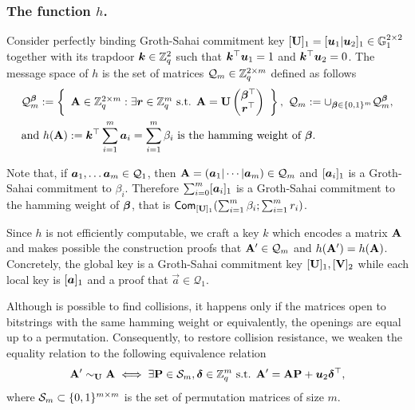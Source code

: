 
\subsubsection{The function $h$.} Consider perfectly binding Groth-Sahai commitment key $[\mathbf{{U}}]_1 = [{\boldsymbol{u}}_1|{\boldsymbol{u}}_2]_1\in\mathbb{G}_1^{2\times 2}$ together with its trapdoor ${\boldsymbol{k}}\in\mathbb{Z}_q^2$ such that ${\boldsymbol{k}}^\top{\boldsymbol{u}}_1 = 1$ and ${\boldsymbol{k}}^\top{\boldsymbol{u}}_2 = 0$. The message space of $h$ is the set of matrices $\mathcal{Q}_m\in\mathbb{Z}_q^{2\times m}$ defined as follows
\begin{align*}
&\mathcal{Q}_m^{\boldsymbol{\beta}} := \left\{
\begin{array}{c}
\mathbf{{A}} \in \mathbb{Z}_q^{2\times m}:
\exists {\boldsymbol{r}}\in\mathbb{Z}_q^m\text{ s.t. }
{\mathbf{{A}} = \mathbf{{U}}\left(\begin{matrix}{\boldsymbol{\beta}}^\top\\{\boldsymbol{r}}^\top\end{matrix}\right)
}
\end{array}\right\},
\ \mathcal{Q}_m := \cup_{{\boldsymbol{\beta}}\in\{0,1\}^m} \mathcal{Q}_m^{\boldsymbol{\beta}},\\
&\text{and } h(\mathbf{{A}}):= {\boldsymbol{k}}^\top\sum_{i=1}^m{\boldsymbol{a}}_i = \sum_{i=1}^m \beta_i \text{ is the hamming weight of }{\boldsymbol{\beta}}.
\end{align*}

Note that, if ${\boldsymbol{a}}_1,\ldots {\boldsymbol{a}}_m\in\mathcal{Q}_{1}$, then $\matr{A} = (\vec{a}_1\cat\cdots\cat\vecb{a}_m)\in\mathcal{Q}_{m}$ and $[{\boldsymbol{a}}_i]_1$ is a Groth-Sahai commitment to $\beta_i$.
Therefore $\sum_{i=0}^m[{\boldsymbol{a}}_i]_1$ is a Groth-Sahai commitment to the hamming weight of ${\boldsymbol{\beta}}$, that is $\mathsf{Com}_{[\mathbf{{U}}]_1}(\sum_{i=1}^m \beta_i;\sum_{i=1}^m r_i)$.

Since $h$ is not efficiently computable, we craft a key $k$ which encodes a matrix $\mathbf{{A}}$ and makes possible the construction proofs that $\mathbf{{A}}'\in\mathcal{Q}_m$ and $h(\mathbf{{A}}')=h(\mathbf{{A}})$. Concretely, the global key is a Groth-Sahai commitment key $[\mathbf{{U}}]_1,[\mathbf{{V}}]_2$ while each local key is $[{\boldsymbol{a}}]_1$ and a proof that $\vec{a}\in\mathcal{Q}_1$.

Although is possible to find collisions, it happens only if the matrices open to bitstrings with the same hamming weight or equivalently, the openings are equal up to a permutation. Consequently, to restore collision resistance, we weaken the equality relation to the following equivalence relation
$$
\mathbf{{A}}' \sim_{\mathbf{{U}}} \mathbf{{A}} \iff \exists \mathbf{{P}}\in\mathcal{S}_m, {\boldsymbol{\delta}}\in\mathbb{Z}_q^m \text{ s.t. } \mathbf{{A}}' = \mathbf{{A}}\mathbf{{P}} + {\boldsymbol{u}}_2{\boldsymbol{\delta}}^\top,
$$
where $\mathcal{S}_m\subset \{0,1\}^{m\times m}$ is the set of permutation matrices of size $m$.

